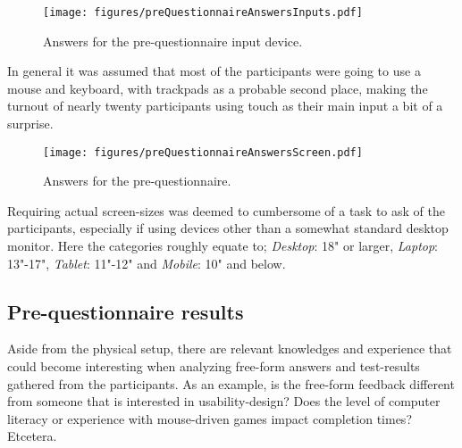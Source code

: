     \begin{figure}[h!]
      \centering
      \texttt{[image: figures/preQuestionnaireAnswersInputs.pdf]}
      \caption{Answers for the pre-questionnaire input device.}
    \end{figure}

    In general it was assumed that most of the participants were going to
    use a mouse and keyboard, with trackpads as a probable second place,
    making the turnout of nearly twenty participants using touch as their
    main input a bit of a surprise.


    \begin{figure}[h!]
      \centering
      \texttt{[image: figures/preQuestionnaireAnswersScreen.pdf]}
      \caption{Answers for the pre-questionnaire.}
    \end{figure}

    Requiring actual screen-sizes was deemed to cumbersome of a task to
    ask of the participants, especially if using devices other than a
    somewhat standard desktop monitor. Here the categories roughly equate
    to; \textit{Desktop}: 18" or larger, \textit{Laptop}: 13"-17", \textit{Tablet}:
    11"-12" and \textit{Mobile}: 10" and below.

  \subsection{Pre-questionnaire results}

    Aside from the physical setup, there are relevant knowledges and
    experience that could become interesting when analyzing free-form
    answers and test-results gathered from the participants. As an example,
    is the free-form feedback different from someone that is interested in
    usability-design? Does the level of computer literacy or experience
    with mouse-driven games impact completion times? Etcetera.

